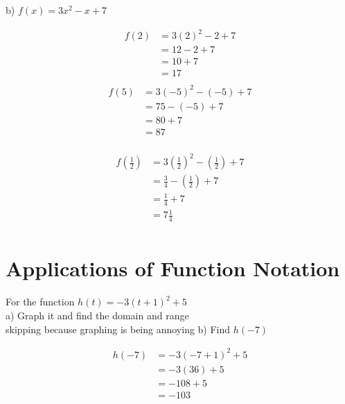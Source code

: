 \documentclass{article}
\begin{document}
b) $f(x) = 3x^2 - x + 7$

\begin{multicols}{2}
\noindent
\begin{equation*}
\begin{split}
    f(2) &= 3(2)^2 - 2 + 7\\
    &= 12 - 2 + 7\\
    &= 10 + 7\\
    &= 17\\
\end{split}
\end{equation*}
\begin{equation*}
\begin{split}
    f(5) &= 3(-5)^2 - (-5) + 7\\
    &= 75 - (-5) + 7\\
    &= 80 + 7\\
    &= 87\\
\end{split}
\end{equation*}
\end{multicols}
\begin{equation*}
\begin{split}
    f\left(\frac{1}{2}\right) &= 3\left(\frac{1}{2}\right)^2 - \left(\frac{1}{2}\right) + 7\\
    &= \frac{3}{4} - \left(\frac{1}{2}\right) + 7\\
    &= \frac{1}{4} + 7\\
    &= 7\frac{1}{4}\\
\end{split}
\end{equation*}

\newpage
\section*{Applications of Function Notation}
For the function $h(t) = -3(t+1)^2 + 5$\\
\indent
a) Graph it and find the domain and range\\
\indent
skipping because graphing is being annoying
b) Find $h(-7)$

\begin{equation*}
\begin{split}
    h(-7) &= -3(-7+1)^2+5\\
          &= -3(36)+5\\
          &= -108+5\\
          &= -103\\
\end{split}
\end{equation*}
\end{document}
